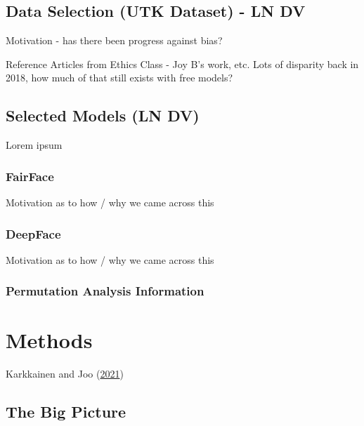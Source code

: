 \documentclass[
  letterpaper,
  DIV=11,
  numbers=noendperiod]{scrreprt}
\begin{document}
\hypertarget{data-selection-utk-dataset---ln-dv}{%
\section{Data Selection (UTK Dataset) - LN
DV}\label{data-selection-utk-dataset---ln-dv}}

Motivation - has there been progress against bias?

Reference Articles from Ethics Class - Joy B's work, etc. Lots of
disparity back in 2018, how much of that still exists with free models?

\hypertarget{selected-models-ln-dv}{%
\section{Selected Models (LN DV)}\label{selected-models-ln-dv}}

Lorem ipsum

\hypertarget{fairface}{%
\subsection{FairFace}\label{fairface}}

Motivation as to how / why we came across this

\hypertarget{deepface}{%
\subsection{DeepFace}\label{deepface}}

Motivation as to how / why we came across this

\hypertarget{permutation-analysis-information}{%
\subsection{Permutation Analysis
Information}\label{permutation-analysis-information}}


\hypertarget{methods}{%
\chapter{Methods}\label{methods}}

Karkkainen and Joo (\protect\hyperlink{ref-fairface}{2021})

\hypertarget{the-big-picture}{%
\section{The Big Picture}\label{the-big-picture}}
\end{document}
